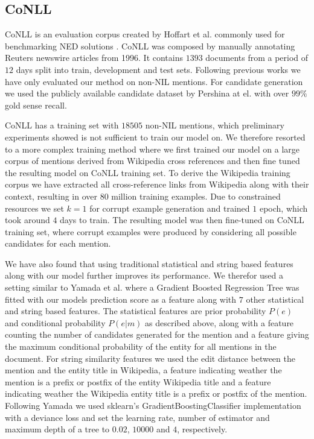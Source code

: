 \documentclass[11pt]{article}
\begin{document}
\subsection{CoNLL}
CoNLL is an evaluation corpus created by Hoffart et al.  commonly used for benchmarking NED solutions \cite{Globerson2016,Hachey2013,Yamada2016,Pershina2015}. CoNLL was composed by manually annotating Reuters newswire articles from 1996. It contains $1393$ documents from a period of $12$ days split into train, development and test sets. Following previous works we have only evaluated our method on non-NIL mentions. For candidate generation we used the publicly available candidate dataset by Pershina at el.  with over $99\%$ gold sense recall.

CoNLL has a training set with $18505$ non-NIL mentions, which preliminary experiments showed is not sufficient to train our model on. We therefore resorted to a more complex training method where we first trained our model on a large corpus of mentions derived from Wikipedia cross references and then fine tuned the resulting model on CoNLL training set. To derive the Wikipedia training corpus we have extracted all cross-reference links from Wikipedia along with their context, resulting in over $80$ million training examples. Due to constrained resources we set $k=1$ for corrupt example generation and trained $1$ epoch, which took around $4$ days to train. The resulting model was then fine-tuned on CoNLL training set, where corrupt examples were produced by considering all possible candidates for each mention.

We have also found that using traditional statistical and string based features along with our model further improves its performance. We therefor used a setting similar to Yamada et al.  where a Gradient Boosted Regression Tree was fitted with our models prediction score as a feature along with $7$ other statistical and string based features. The statistical features are prior probability $P(e)$ and conditional probability $P(e|m)$ as described above, along with a feature counting the number of candidates generated for the mention and a feature giving the maximum conditional probability of the entity for all mentions in the document. For string similarity features we used the edit distance between the mention and the entity title in Wikipedia, a feature indicating weather the mention is a prefix or postfix of the entity Wikipedia title and a feature indicating weather the Wikipedia entity title is a prefix or postfix of the mention. Following Yamada we used sklearn's GradientBoostingClassifier implementation \cite{pedregosa2011scikit} with a deviance loss and set the learning rate, number of estimator and maximum depth of a tree to $0.02$, $10000$ and $4$, respectively. 
\end{document}
